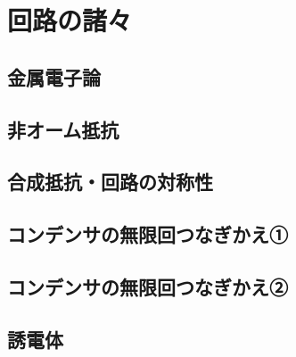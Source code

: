\documentclass[../../../all/physics-standard_questions_all.tex]{subfiles}
\begin{document}
\section{回路の諸々}

\subsection{金属電子論}
    

    \vspace{2cm}
    \vfill

\subsection{非オーム抵抗}
    

    \vspace{2cm}
    \vfill

\subsection{合成抵抗・回路の対称性}
    

    \vspace{2cm}
    \vfill

\subsection{コンデンサの無限回つなぎかえ①}
    

    \vspace{2cm}
    \vfill 

\subsection{コンデンサの無限回つなぎかえ②}
       

    \vspace{2cm}
    \vfill

\subsection{誘電体}
    
\end{document}
